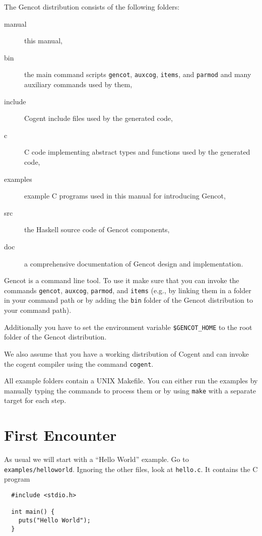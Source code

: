 \documentclass[a4paper]{report}
\newcommand{\code}[1]{\textnormal{\texttt{#1}}}
\begin{document}
The Gencot distribution consists of the following folders:
\begin{description}
\item[manual] this manual,
\item[bin] the main command scripts \code{gencot}, \code{auxcog}, \code{items}, and \code{parmod} and many auxiliary commands used by them,
\item[include] Cogent include files used by the generated code,
\item[c] C code implementing abstract types and functions used by the generated code,
\item[examples] example C programs used in this manual for introducing Gencot,
\item[src] the Haskell source code of Gencot components,
\item[doc] a comprehensive documentation of Gencot design and implementation.
\end{description}

Gencot is a command line tool. To use it make sure that you can invoke the commands \code{gencot}, \code{auxcog},
\code{parmod}, and \code{items} (e.g., by linking them in a folder in your command path or by adding the \code{bin} folder
of the Gencot distribution to your command path).

Additionally you have to set the environment variable \code{\$GENCOT\_HOME} to the root folder of the Gencot
distribution.

We also assume that you have a working distribution of Cogent and can invoke the cogent compiler using the
command \code{cogent}.

All example folders contain a UNIX Makefile. You can either run the examples by manually typing the commands
to process them or by using \code{make} with a separate target for each step.

\section{First Encounter}
\label{intro-first}

As usual we will start with a ``Hello World'' example. Go to \code{examples/helloworld}. Ignoring the other files,
look at \code{hello.c}. It contains the C program
\begin{verbatim}
  #include <stdio.h>

  int main() {
    puts("Hello World");
  }
\end{verbatim}
\end{document}
